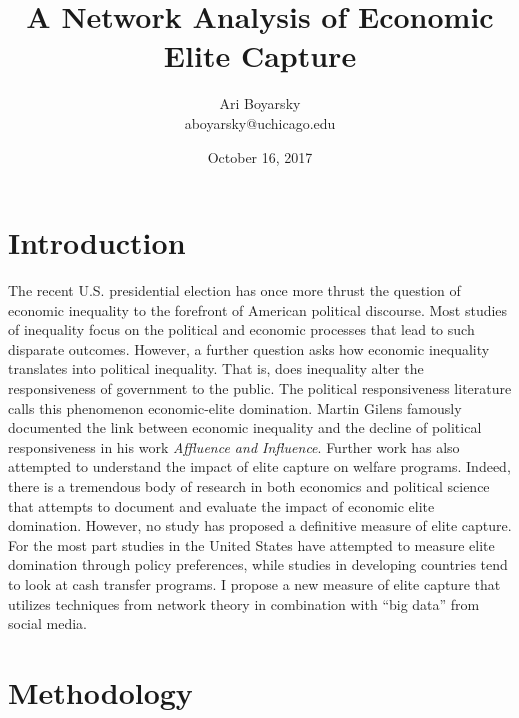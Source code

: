\documentclass[dvips,12pt]{article}
\begin{document}


\title{A Network Analysis of Economic Elite Capture}
\author{Ari Boyarsky \\ aboyarsky@uchicago.edu}
\date{October 16, 2017}




\maketitle


\section{Introduction}

\indent The recent U.S. presidential election has once more thrust the question of economic inequality to the forefront of American political discourse. Most studies of inequality focus on the political and economic processes that lead to such disparate outcomes. However, a further question asks how economic inequality translates into political inequality. That is, does inequality alter the responsiveness of government to the public. The political responsiveness literature calls this phenomenon economic-elite domination.\cite{RefWorks:doc:59e2928ee4b07e3b24389b4d} Martin Gilens famously documented the link between economic inequality and the decline of political responsiveness in his work \textit{Affluence and Influence}.\cite{RefWorks:doc:59e2931fe4b0b4635e033b19} Further work has also attempted to understand the impact of elite capture on welfare programs.\cite{RefWorks:doc:59e29357e4b0b4635e033b1f} Indeed, there is a tremendous body of research in both economics and political science that attempts to document and evaluate the impact of economic elite domination. However, no study has proposed a definitive measure of elite capture. For the most part studies in the United States have attempted to measure elite domination through policy preferences, while studies in developing countries tend to look at cash transfer programs. I propose a new measure of elite capture that utilizes techniques from network theory in combination with “big data” from social media. 



\section{Methodology}
\end{document}
